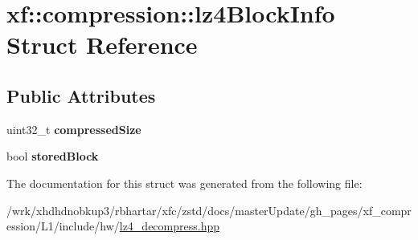 \hypertarget{structxf_1_1compression_1_1lz4BlockInfo}{\section{xf\-:\-:compression\-:\-:lz4\-Block\-Info Struct Reference}
\label{structxf_1_1compression_1_1lz4BlockInfo}
}
\subsection*{Public Attributes}
\begin{DoxyCompactItemize}
\item 
\hypertarget{structxf_1_1compression_1_1lz4BlockInfo_afc520ad8a6b4a9434287649dd1483082}{uint32\-\_\-t {\bfseries compressed\-Size}}\label{structxf_1_1compression_1_1lz4BlockInfo_afc520ad8a6b4a9434287649dd1483082}

\item 
\hypertarget{structxf_1_1compression_1_1lz4BlockInfo_ae4eeb5bf41943f51a3db3e2bf569d742}{bool {\bfseries stored\-Block}}\label{structxf_1_1compression_1_1lz4BlockInfo_ae4eeb5bf41943f51a3db3e2bf569d742}

\end{DoxyCompactItemize}


The documentation for this struct was generated from the following file\-:\begin{DoxyCompactItemize}
\item 
/wrk/xhdhdnobkup3/rbhartar/xfc/zstd/docs/master\-Update/gh\-\_\-pages/xf\-\_\-compression/\-L1/include/hw/\hyperlink{lz4__decompress_8hpp}{lz4\-\_\-decompress.\-hpp}\end{DoxyCompactItemize}
